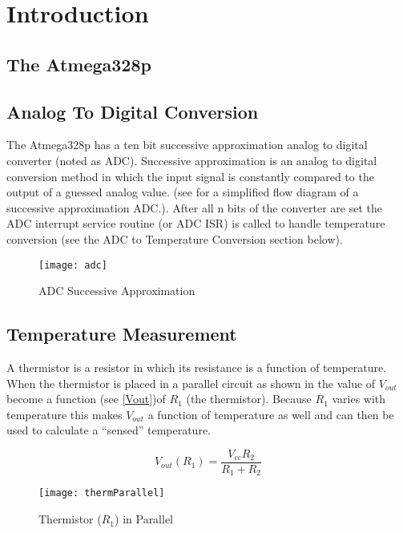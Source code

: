 \documentclass[main.tex]{subfiles}
\begin{document}
\chapter{Introduction}
	\section{The Atmega328p}

	\section{Analog To Digital Conversion}
	\label{sec:ADC}
	The Atmega328p has a ten bit successive approximation analog to digital
	converter (noted as ADC). Successive approximation is an analog to digital
	conversion method in which the input signal is constantly compared to the
	output of a guessed analog value. (see  for a simplified flow
	diagram of a successive approximation ADC.). After all n bits of the converter
	are set the ADC interrupt service routine (or ADC ISR) is called to handle
	temperature conversion (see the ADC to Temperature Conversion section below). 

	\begin{figure}[H]
		\begin{center}
			\texttt{[image: adc]}
		\end{center}
		\caption{ADC Successive Approximation}
		\label{fig:adcSA}
	\end{figure}
		
	
	\section{Temperature Measurement}
	A thermistor is a resistor in which its resistance is a function of
	temperature. When the thermistor is placed in a parallel circuit as shown in
	 the value of $V_{out}$ become a function (see
	\eqref{Vout})of $R_{1}$ (the thermistor). Because $R_{1}$ varies with
	temperature this makes $V_{out}$ a function of temperature as well and can
	then be used to calculate a ``sensed'' temperature.
	
	\begin{equation}
		V_{out}(R_{1}) = \frac{V_{cc}R_{2}}{R_{1}+R_{2}}
		\label{eq:Vout}
	\end{equation}
	
	\begin{figure}[H]
		\begin{center}
			\texttt{[image: thermParallel]}
		\end{center}
		\caption{Thermistor ($R_{1}$) in Parallel}
		\label{fig:parallelThermistor}
	\end{figure}
	
\end{document}
